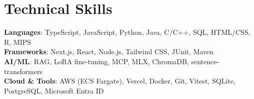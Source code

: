 \documentclass[letterpaper,11pt]{article}
\begin{document}
%
\section{Technical Skills}
 \begin{itemize}[leftmargin=0.15in, label={}]
    \small{\item{
     \textbf{Languages}{: TypeScript, JavaScript, Python, Java, C/C++, SQL, HTML/CSS, R, MIPS} \\
     \textbf{Frameworks}{: Next.js, React, Node.js, Tailwind CSS, JUnit, Maven} \\
     \textbf{AI/ML}{: RAG, LoRA fine-tuning, MCP, MLX, ChromaDB, sentence-transformers} \\
     \textbf{Cloud \& Tools}{: AWS (ECS Fargate), Vercel, Docker, Git, Vitest, SQLite, PostgreSQL, Microsoft Entra ID} \\
    }}
 \end{itemize}


\end{document}
